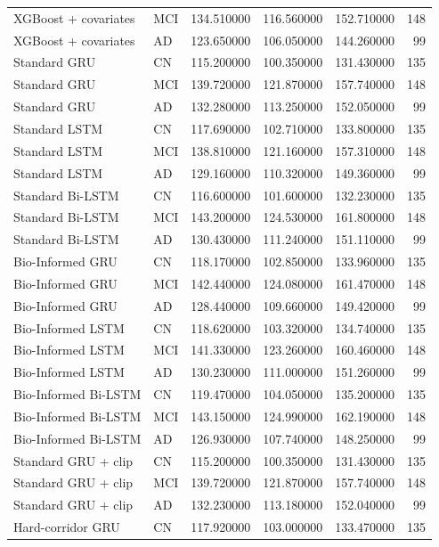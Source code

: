 \begin{tabular}{llrrrr}
XGBoost + covariates & MCI & 134.510000 & 116.560000 & 152.710000 & 148 \\
XGBoost + covariates & AD & 123.650000 & 106.050000 & 144.260000 & 99 \\
Standard GRU & CN & 115.200000 & 100.350000 & 131.430000 & 135 \\
Standard GRU & MCI & 139.720000 & 121.870000 & 157.740000 & 148 \\
Standard GRU & AD & 132.280000 & 113.250000 & 152.050000 & 99 \\
Standard LSTM & CN & 117.690000 & 102.710000 & 133.800000 & 135 \\
Standard LSTM & MCI & 138.810000 & 121.160000 & 157.310000 & 148 \\
Standard LSTM & AD & 129.160000 & 110.320000 & 149.360000 & 99 \\
Standard Bi-LSTM & CN & 116.600000 & 101.600000 & 132.230000 & 135 \\
Standard Bi-LSTM & MCI & 143.200000 & 124.530000 & 161.800000 & 148 \\
Standard Bi-LSTM & AD & 130.430000 & 111.240000 & 151.110000 & 99 \\
Bio-Informed GRU & CN & 118.170000 & 102.850000 & 133.960000 & 135 \\
Bio-Informed GRU & MCI & 142.440000 & 124.080000 & 161.470000 & 148 \\
Bio-Informed GRU & AD & 128.440000 & 109.660000 & 149.420000 & 99 \\
Bio-Informed LSTM & CN & 118.620000 & 103.320000 & 134.740000 & 135 \\
Bio-Informed LSTM & MCI & 141.330000 & 123.260000 & 160.460000 & 148 \\
Bio-Informed LSTM & AD & 130.230000 & 111.000000 & 151.260000 & 99 \\
Bio-Informed Bi-LSTM & CN & 119.470000 & 104.050000 & 135.200000 & 135 \\
Bio-Informed Bi-LSTM & MCI & 143.150000 & 124.990000 & 162.190000 & 148 \\
Bio-Informed Bi-LSTM & AD & 126.930000 & 107.740000 & 148.250000 & 99 \\
Standard GRU + clip & CN & 115.200000 & 100.350000 & 131.430000 & 135 \\
Standard GRU + clip & MCI & 139.720000 & 121.870000 & 157.740000 & 148 \\
Standard GRU + clip & AD & 132.230000 & 113.180000 & 152.040000 & 99 \\
Hard-corridor GRU & CN & 117.920000 & 103.000000 & 133.470000 & 135 \\

\end{tabular}
